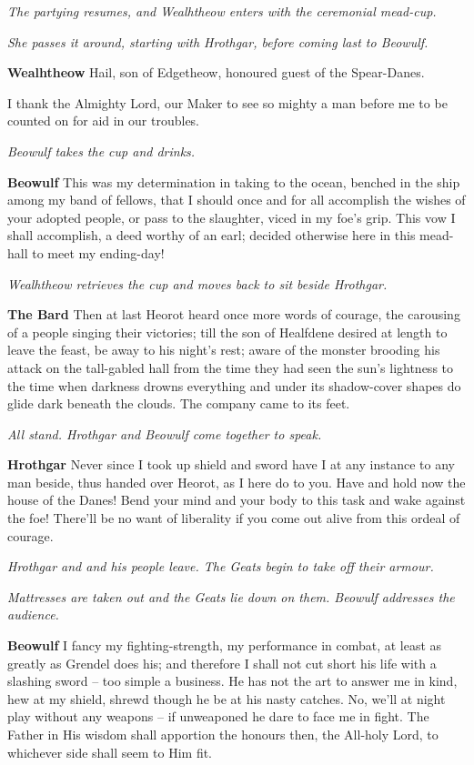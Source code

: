 \documentclass[a4paper]{article}
\begin{document}
{\centerline{\textit{The partying resumes, and Wealhtheow enters with the ceremonial mead-cup.}}
\centerline{\textit{She passes it around, starting with Hrothgar, before coming last to Beowulf.}}

\textbf{Wealhtheow} Hail, son of Edgetheow,
honoured guest of the Spear-Danes.

I thank the Almighty Lord, our Maker
to see so mighty a man before me
to be counted on for aid in our troubles.

\centerline{\textit{Beowulf takes the cup and drinks.}}

\textbf{Beowulf} This was my determination in taking to the ocean,
benched in the ship among my band of fellows,
that I should once and for all accomplish the wishes
of your adopted people, or pass to the slaughter,
viced in my foe’s grip. This vow I shall accomplish,
a deed worthy of an earl; decided otherwise
here in this mead-hall to meet my ending-day!

\centerline{\textit{Wealhtheow retrieves the cup and moves back to sit beside Hrothgar.}}

\textbf{The Bard} Then at last Heorot heard once more
words of courage, the carousing of a people
singing their victories; till the son of Healfdene
desired at length to leave the feast,
be away to his night’s rest; aware of the monster
brooding his attack on the tall-gabled hall
from the time they had seen the sun’s lightness
to the time when darkness drowns everything
and under its shadow-cover shapes do glide
dark beneath the clouds. 
The company came to its feet.

\centerline{\textit{All stand. Hrothgar and Beowulf come together to speak.}}

\textbf{Hrothgar} Never since I took up shield and sword
have I at any instance to any man beside,
thus handed over Heorot, as I here do to you.
Have and hold now the house of the Danes!
Bend your mind and your body to this task
and wake against the foe! There’ll be no want of liberality
if you come out alive from this ordeal of courage.

\centerline{\textit{Hrothgar and and his people leave. The Geats begin to take off their armour.}}
\centerline{\textit{Mattresses are taken out and the Geats lie down on them. Beowulf addresses the audience.}}

\textbf{Beowulf} I fancy my fighting-strength, my performance in combat,
at least as greatly as Grendel does his;
and therefore I shall not cut short his life
with a slashing sword – too simple a business.
He has not the art to answer me in kind,
hew at my shield, shrewd though he be
at his nasty catches. No, we’ll at night play
without any weapons – if unweaponed he dare
to face me in fight. The Father in His wisdom
shall apportion the honours then, the All-holy Lord,
to whichever side shall seem to Him fit.

}
\end{document}

